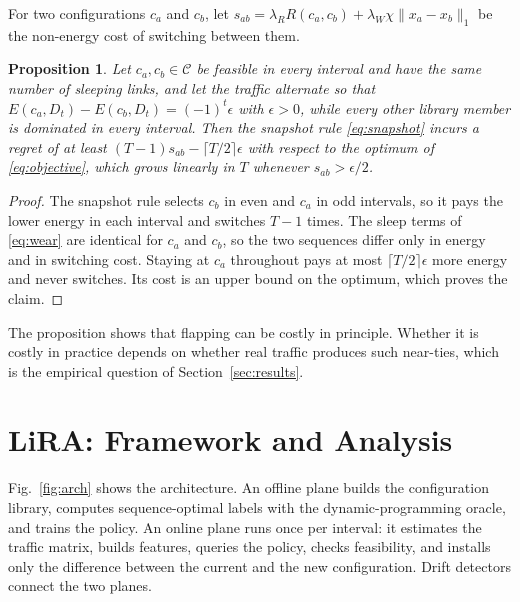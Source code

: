 \documentclass[preprint,12pt]{elsarticle}
\newtheorem{proposition}{Proposition}
\begin{document}
For two configurations $c_a$ and $c_b$, let $s_{ab}=\lambda_R R(c_a,c_b)+\lambda_W\chi\|x_a-x_b\|_1$ be the non-energy cost of switching between them.

\begin{proposition}\label{prop:snapshot}
Let $c_a,c_b\in\mathcal{C}$ be feasible in every interval and have the same number of sleeping links, and let the traffic alternate so that $E(c_a,D_t)-E(c_b,D_t)=(-1)^t\epsilon$ with $\epsilon>0$, while every other library member is dominated in every interval. Then the snapshot rule \eqref{eq:snapshot} incurs a regret of at least $(T-1)s_{ab}-\lceil T/2\rceil\epsilon$ with respect to the optimum of \eqref{eq:objective}, which grows linearly in $T$ whenever $s_{ab}>\epsilon/2$.
\end{proposition}
\begin{proof}
The snapshot rule selects $c_b$ in even and $c_a$ in odd intervals, so it pays the lower energy in each interval and switches $T-1$ times. The sleep terms of \eqref{eq:wear} are identical for $c_a$ and $c_b$, so the two sequences differ only in energy and in switching cost. Staying at $c_a$ throughout pays at most $\lceil T/2\rceil\epsilon$ more energy and never switches. Its cost is an upper bound on the optimum, which proves the claim.
\end{proof}

The proposition shows that flapping can be costly in principle. Whether it is costly in practice depends on whether real traffic produces such near-ties, which is the empirical question of Section~\ref{sec:results}.

\section{LiRA: Framework and Analysis}\label{sec:framework}

Fig.~\ref{fig:arch} shows the architecture. An offline plane builds the configuration library, computes sequence-optimal labels with the dynamic-programming oracle, and trains the policy. An online plane runs once per interval: it estimates the traffic matrix, builds features, queries the policy, checks feasibility, and installs only the difference between the current and the new configuration. Drift detectors connect the two planes.
\end{document}
